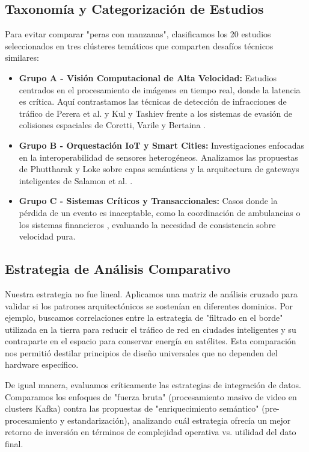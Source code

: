 \subsection{Taxonomía y Categorización de Estudios}
Para evitar comparar "peras con manzanas", clasificamos los 20 estudios seleccionados en tres clústeres temáticos que comparten desafíos técnicos similares:

\begin{itemize}
    \item \textbf{Grupo A - Visión Computacional de Alta Velocidad:} Estudios centrados en el procesamiento de imágenes en tiempo real, donde la latencia es crítica. Aquí contrastamos las técnicas de detección de infracciones de tráfico de Perera et al. \cite{perera2024traffic} y Kul y Tashiev \cite{kul2021microservices} frente a los sistemas de evasión de colisiones espaciales de Coretti, Varile y Bertaina \cite{coretti2025neuromorphic}.
    \item \textbf{Grupo B - Orquestación IoT y Smart Cities:} Investigaciones enfocadas en la interoperabilidad de sensores heterogéneos. Analizamos las propuestas de Phuttharak y Loke \cite{phuttharak2023smartcity} sobre capas semánticas y la arquitectura de gateways inteligentes de Salamon et al. \cite{salamon2018gateway}.
    \item \textbf{Grupo C - Sistemas Críticos y Transaccionales:} Casos donde la pérdida de un evento es inaceptable, como la coordinación de ambulancias \cite{bruns2014fusion} o los sistemas financieros \cite{adekunle2024financial}, evaluando la necesidad de consistencia sobre velocidad pura.
\end{itemize}

\subsection{Estrategia de Análisis Comparativo}
Nuestra estrategia no fue lineal. Aplicamos una matriz de análisis cruzado para validar si los patrones arquitectónicos se sostenían en diferentes dominios.
Por ejemplo, buscamos correlaciones entre la estrategia de "filtrado en el borde" utilizada en la tierra para reducir el tráfico de red en ciudades inteligentes y su contraparte en el espacio para conservar energía en satélites. Esta comparación nos permitió destilar principios de diseño universales que no dependen del hardware específico.

De igual manera, evaluamos críticamente las estrategias de integración de datos. Comparamos los enfoques de "fuerza bruta" (procesamiento masivo de video en clusters Kafka) contra las propuestas de "enriquecimiento semántico" (pre-procesamiento y estandarización), analizando cuál estrategia ofrecía un mejor retorno de inversión en términos de complejidad operativa vs. utilidad del dato final.

